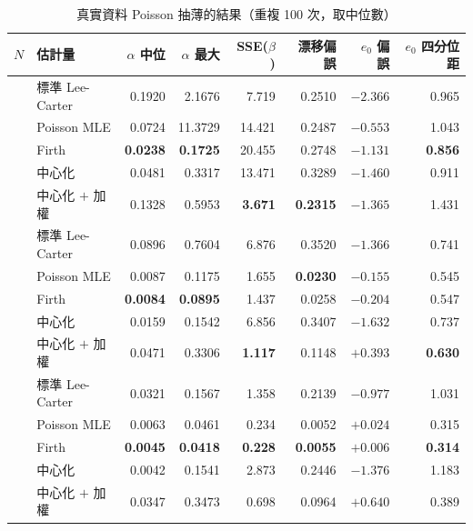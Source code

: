 \documentclass[UTF8, fontset=macnew, a4paper, 12pt]{ctexart}
\begin{document}
\begin{table}[H]
\centering
\caption{真實資料 Poisson 抽薄的結果（重複 100 次，取中位數）}
\footnotesize
\begin{tabular}{llrrrrrr}
\toprule
$N$ & 估計量 & $\alpha$ 中位 & $\alpha$ 最大 & SSE($\beta$) & 漂移偏誤 & $e_0$ 偏誤 & $e_0$ 四分位距\\
\midrule
{}
 & 標準 Lee-Carter          & 0.1920 & 2.1676 & 7.719 & 0.2510 & $-2.366$ & 0.965\\
 & Poisson MLE       & 0.0724 & 11.3729 & 14.421 & 0.2487 & \textbf{$-0.553$} & 1.043\\
 & Firth            & \textbf{0.0238} & \textbf{0.1725} & 20.455 & 0.2748 & $-1.131$ & \textbf{0.856}\\
 & 中心化           & 0.0481 & 0.3317 & 13.471 & 0.3289 & $-1.460$ & 0.911\\
 & 中心化 $+$ 加權   & 0.1328 & 0.5953 & \textbf{3.671} & \textbf{0.2315} & $-1.365$ & 1.431\\
\midrule
{}
 & 標準 Lee-Carter          & 0.0896 & 0.7604 & 6.876 & 0.3520 & $-1.366$ & 0.741\\
 & Poisson MLE       & 0.0087 & 0.1175 & 1.655 & \textbf{0.0230} & \textbf{$-0.155$} & 0.545\\
 & Firth            & \textbf{0.0084} & \textbf{0.0895} & 1.437 & 0.0258 & $-0.204$ & 0.547\\
 & 中心化           & 0.0159 & 0.1542 & 6.856 & 0.3407 & $-1.632$ & 0.737\\
 & 中心化 $+$ 加權   & 0.0471 & 0.3306 & \textbf{1.117} & 0.1148 & $+0.393$ & \textbf{0.630}\\
\midrule
{}
 & 標準 Lee-Carter          & 0.0321 & 0.1567 & 1.358 & 0.2139 & $-0.977$ & 1.031\\
 & Poisson MLE       & 0.0063 & 0.0461 & 0.234 & 0.0052 & $+0.024$ & 0.315\\
 & Firth            & \textbf{0.0045} & \textbf{0.0418} & \textbf{0.228} & \textbf{0.0055} & \textbf{$+0.006$} & \textbf{0.314}\\
 & 中心化           & 0.0042 & 0.1541 & 2.873 & 0.2446 & $-1.376$ & 1.183\\
 & 中心化 $+$ 加權   & 0.0347 & 0.3473 & 0.698 & 0.0964 & $+0.640$ & 0.389\\
\bottomrule
\end{tabular}
\label{tab:real}
\end{table}
\end{document}
